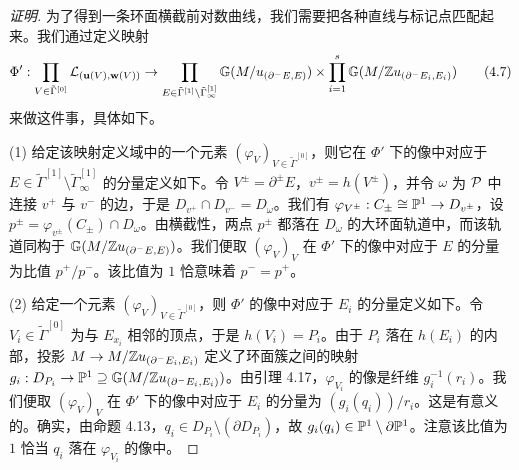 \begin{proof}[证明]
为了得到一条环面横截前对数曲线，我们需要把各种直线与标记点匹配起来。我们通过定义映射
\begin{equation}
\Phi':\prod_{V\in\tilde\Gamma^{[0]}}\mathcal{L}_{(\mathbf{u}(V),\mathbf{w}(V))}\to\prod_{E\in\tilde\Gamma^{[1]}\setminus\tilde\Gamma^{[1]}_\infty}\mathbb{G}(M/u_{(\partial^-E,E)})\times\prod_{i=1}^s\mathbb{G}(M/\mathbb{Z} u_{(\partial^-E_i,E_i)})
\tag{4.7}
\end{equation}
来做这件事，具体如下。


(1) 给定该映射定义域中的一个元素 $(\varphi_V)_{V\in\tilde\Gamma^{[0]}}$，则它在 $\Phi'$ 下的像中对应于 $E\in\tilde\Gamma^{[1]}\setminus\tilde\Gamma^{[1]}_\infty$ 的分量定义如下。令 $V^\pm=\partial^\pm E$，$v^\pm=h(V^\pm)$，并令 $\omega$ 为 $\mathcal{P}$ 中连接 $v^+$ 与 $v^-$ 的边，于是 $D_{v^+}\cap D_{v^-}=D_\omega$。我们有 $\varphi_{V^\pm}:C_\pm\cong\mathbb{P}^1\to D_{v^\pm}$，设 $p^\pm=\varphi_{v^\pm}(C_\pm)\cap D_\omega$。由横截性，两点 $p^\pm$ 都落在 $D_\omega$ 的大环面轨道中，而该轨道同构于 $\mathbb{G}(M/\mathbb{Z} u_{(\partial^-E,E)})$。我们便取 $(\varphi_V)_V$ 在 $\Phi'$ 下的像中对应于 $E$ 的分量为比值 $p^+/p^-$。该比值为 $1$ 恰意味着 $p^-=p^+$。

(2) 给定一个元素 $(\varphi_V)_{V\in\tilde\Gamma^{[0]}}$，则 $\Phi'$ 的像中对应于 $E_i$ 的分量定义如下。令 $V_i\in\tilde\Gamma^{[0]}$ 为与 $E_{x_i}$ 相邻的顶点，于是 $h(V_i)=P_i$。由于 $P_i$ 落在 $h(E_i)$ 的内部，投影 $M\to M/\mathbb{Z} u_{(\partial^-E_i,E_i)}$ 定义了环面簇之间的映射 $g_i:D_{P_i}\to\mathbb{P}^1\supseteq\mathbb{G}(M/\mathbb{Z} u_{(\partial^-E_i,E_i)})$。由引理 4.17，$\varphi_{V_i}$ 的像是纤维 $g_i^{-1}(r_i)$。我们便取 $(\varphi_V)_V$ 在 $\Phi'$ 下的像中对应于 $E_i$ 的分量为 $(g_i(q_i))/r_i$。这是有意义的。确实，由命题 4.13，$q_i\in D_{P_i}\setminus(\partial D_{P_i})$，故 $g_i(q_i)\in\mathbb{P}^1\setminus\partial\mathbb{P}^1$。注意该比值为 $1$ 恰当 $q_i$ 落在 $\varphi_{V_i}$ 的像中。


\end{proof}
